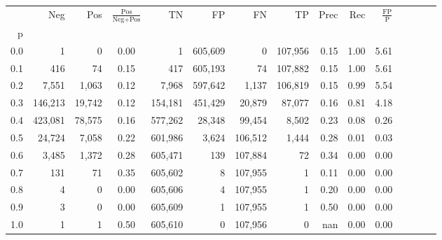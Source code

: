\begin{tabular}{rrrcrrrrrrrrrrr}
\toprule
{} &      Neg &     Pos & $\frac{\text{Pos}}{\text{Neg}+\text{Pos}}$ &       TN &       FP &       FN &       TP &  Prec &   Rec & $\frac{\text{FP}}{\text{P}}$ \\
p   &          &         &                                            &          &          &          &          &       &       &                              \\
\midrule
0.0 &        1 &       0 &                                       0.00 &        1 &  605,609 &        0 &  107,956 &  0.15 &  1.00 &                         5.61 \\
0.1 &      416 &      74 &                                       0.15 &      417 &  605,193 &       74 &  107,882 &  0.15 &  1.00 &                         5.61 \\
0.2 &    7,551 &   1,063 &                                       0.12 &    7,968 &  597,642 &    1,137 &  106,819 &  0.15 &  0.99 &                         5.54 \\
0.3 &  146,213 &  19,742 &                                       0.12 &  154,181 &  451,429 &   20,879 &   87,077 &  0.16 &  0.81 &                         4.18 \\
0.4 &  423,081 &  78,575 &                                       0.16 &  577,262 &   28,348 &   99,454 &    8,502 &  0.23 &  0.08 &                         0.26 \\
0.5 &   24,724 &   7,058 &                                       0.22 &  601,986 &    3,624 &  106,512 &    1,444 &  0.28 &  0.01 &                         0.03 \\
0.6 &    3,485 &   1,372 &                                       0.28 &  605,471 &      139 &  107,884 &       72 &  0.34 &  0.00 &                         0.00 \\
0.7 &      131 &      71 &                                       0.35 &  605,602 &        8 &  107,955 &        1 &  0.11 &  0.00 &                         0.00 \\
0.8 &        4 &       0 &                                       0.00 &  605,606 &        4 &  107,955 &        1 &  0.20 &  0.00 &                         0.00 \\
0.9 &        3 &       0 &                                       0.00 &  605,609 &        1 &  107,955 &        1 &  0.50 &  0.00 &                         0.00 \\
1.0 &        1 &       1 &                                       0.50 &  605,610 &        0 &  107,956 &        0 &   nan &  0.00 &                         0.00 \\
\bottomrule
\end{tabular}
